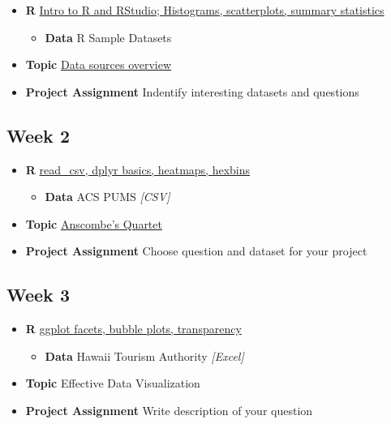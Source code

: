 \documentclass[]{book}
\providecommand{\tightlist}{%
  \setlength{\itemsep}{0pt}\setlength{\parskip}{0pt}}
\theoremstyle{definition}
\theoremstyle{definition}
\theoremstyle{remark}
\begin{document}
\begin{itemize}
\tightlist
\item
  \textbf{R} \protect\hyperlink{intro}{Intro to R and RStudio;
  Histograms, scatterplots, summary statistics}

  \begin{itemize}
  \tightlist
  \item
    \textbf{Data} R Sample Datasets
  \end{itemize}
\item
  \textbf{Topic} \protect\hyperlink{data-sources}{Data sources overview}
\item
  \textbf{Project Assignment} Indentify interesting datasets and
  questions
\end{itemize}

\subsection*{Week 2}\label{week-2}

\begin{itemize}
\tightlist
\item
  \textbf{R} \protect\hyperlink{read-data}{read\_csv, dplyr basics,
  heatmaps, hexbins}

  \begin{itemize}
  \tightlist
  \item
    \textbf{Data} ACS PUMS \emph{{[}CSV{]}}
  \end{itemize}
\item
  \textbf{Topic} \protect\hyperlink{anscombe}{Anscombe's Quartet}
\item
  \textbf{Project Assignment} Choose question and dataset for your
  project
\end{itemize}

\subsection*{Week 3}\label{week-3}

\begin{itemize}
\tightlist
\item
  \textbf{R} \protect\hyperlink{facets-and-bubbles}{ggplot facets,
  bubble plots, transparency}

  \begin{itemize}
  \tightlist
  \item
    \textbf{Data} Hawaii Tourism Authority \emph{{[}Excel{]}}
  \end{itemize}
\item
  \textbf{Topic} Effective Data Visualization
\item
  \textbf{Project Assignment} Write description of your question
\end{itemize}
\end{document}
